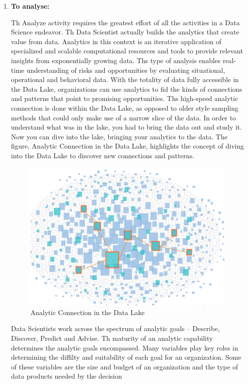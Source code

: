 \documentclass[a4paper,12pt,oneside]{report}
\begin{document}
{\begin{enumerate}
\item \textbf {To analyse: }{Th Analyze activity requires the greatest effort of all the activities in a Data Science endeavor. Th Data Scientist actually builds the analytics that create value from data. Analytics in this context is
an iterative application of specialized and scalable computational resources and tools to provide relevant insights from exponentially growing data. Ths type of analysis enables real-time understanding of risks and opportunities by evaluating situational, operational and behavioral data. With the totality of data fully accessible in the Data Lake, organizations can use analytics to fid the kinds of connections and patterns that point to promising opportunities. Ths high-speed analytic connection is done within the Data Lake, as opposed to older style sampling methods that could only make use of a narrow slice of the data. In order to understand what was in the lake, you had to bring the data out and study it. Now you can dive into the lake,
bringing your analytics to the data. The figure, Analytic Connection in the Data Lake, highlights the concept of diving into the Data Lake to discover new connections and patterns.\\
\begin{figure}[ht]
\centering
\includegraphics[width=1\textwidth]{"Capture7"}
\caption{Analytic Connection in the Data Lake}
\end{figure}
Data Scientists work across the spectrum of analytic goals – Describe, Discover, Predict and Advise. Th maturity of an analytic capability determines the analytic goals encompassed. Many variables play key
roles in determining the diffilty and suitability of each goal for an organization. Some of these variables are the size and budget of an organization and the type of data products needed by the decision
}
\end{enumerate}}
\end{document}
